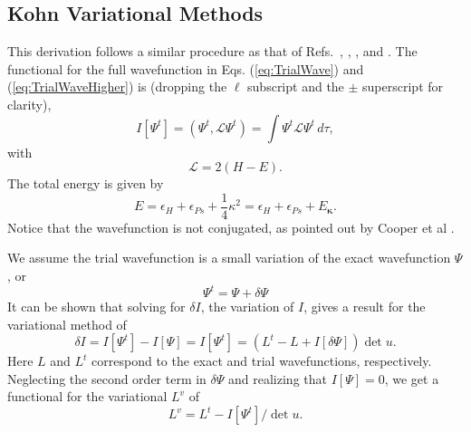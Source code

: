\documentclass[reprint,showpacs,preprintnumbers,amsmath,amssymb,pra,aps]{revtex4-1}
\newcommand{\beq}{\begin{equation}}
\newcommand{\eeq}{\end{equation}}
\begin{document}
\subsection{Kohn Variational Methods}
\label{sec:Kohn}
This derivation follows a similar procedure as that of Refs.~\cite{Lucchese1989}, \cite{Cooper2010}, \cite{Armour1991}, and \cite{VanReethThesis}.
The functional for the full wavefunction in Eqs. (\ref{eq:TrialWave}) and (\ref{eq:TrialWaveHigher}) is (dropping the $\ell$ subscript and the $\pm$ superscript for clarity),
\begin{equation}
I[\Psi^t] = \left(\Psi^t, \mathcal{L} \Psi^t \right) = \int \Psi^t \mathcal{L} \Psi^t \,d\tau,
\label{eq:IlDefPsi}
\end{equation}
with
\beq
\mathcal{L} = 2(H - E).
\label{eq:LDef}
\eeq
The total energy is given by
\begin{equation}
\label{eq:TotalEnergy}
E = \epsilon_H + \epsilon_{Ps} + \frac{1}{4}\kappa^2 = \epsilon_H + \epsilon_{Ps} + E_{\bm \kappa}.
\end{equation}
Notice that the wavefunction is not conjugated, as pointed out by Cooper et al \cite{Cooper2010}.

We assume the trial wavefunction is a small variation of the exact wavefunction $\Psi$, or
\beq
\Psi^t = \Psi + \delta \Psi
\label{eq:PsiTrialRelation}
\eeq
It can be shown that solving for $\delta I$, the variation of $I$, gives a result for the variational method of
\beq
\delta I = I[\Psi^t] - I[\Psi] = I[\Psi^t] = (L^t - L + I[\delta \Psi]) \det u.
\label{eq:IlPsiVariation}
\eeq
Here $L$ and $L^t$ correspond to the exact and trial wavefunctions, respectively. Neglecting the second order term in $\delta \Psi$ and realizing that $I[\Psi] = 0$, we get a functional for the variational $L^v$ of
\beq
L^v = L^t - I[\Psi^t] / \det u.
\label{eq:ComplexKohnVariation}
\eeq
\end{document}

